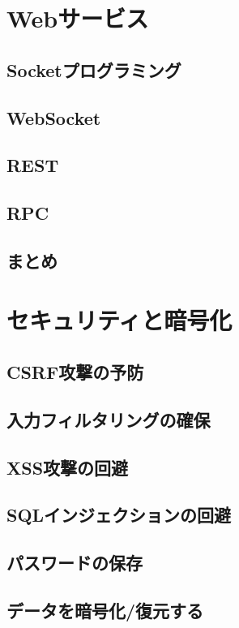 \section{Webサービス}

\subsection{Socketプログラミング}

\subsection{WebSocket}

\subsection{REST}

\subsection{RPC}

\subsection{まとめ}


\section{セキュリティと暗号化}

\subsection{CSRF攻撃の予防}
\subsection{入力フィルタリングの確保}
\subsection{XSS攻撃の回避}
\subsection{SQLインジェクションの回避}
\subsection{パスワードの保存}
\subsection{データを暗号化/復元する}
